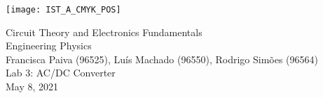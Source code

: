 
\thispagestyle {empty}

\texttt{[image: IST\_A\_CMYK\_POS]}

\begin{center}
%
\vspace{1.0cm}

\vspace{1cm}
{\FontLb Circuit Theory and Electronics Fundamentals} \\ %
\vspace{1cm}
{\FontSn Engineering Physics} \\ %
{\small Francisca Paiva (96525), Luís Machado (96550), Rodrigo Simões (96564)} \\
\vspace{1cm}
{\FontSn Lab 3: AC/DC Converter} \\
\vspace{1cm}
{\FontSn May 8, 2021} \\ %
%
\end{center}
